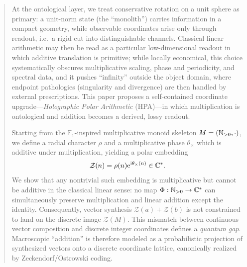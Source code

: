 
\begin{abstract}
At the ontological layer, we treat conservative rotation on a unit sphere as primary: a unit-norm state (the ``monolith'') carries information in a compact geometry, while observable coordinates arise only through readout, i.e.\ a rigid cut into distinguishable channels. Classical linear arithmetic may then be read as a particular low-dimensional readout in which additive translation is primitive; while locally economical, this choice systematically obscures multiplicative scaling, phase and periodicity, and spectral data, and it pushes ``infinity'' outside the object domain, where endpoint pathologies (singularity and divergence) are then handled by external prescriptions. This paper proposes a self-contained coordinate upgrade---\emph{Holographic Polar Arithmetic} (HPA)---in which multiplication is ontological and addition becomes a derived, lossy readout.

Starting from the $\mathbb{F}_1$-inspired multiplicative monoid skeleton $M=(\NN_{>0},\cdot)$, we define a radial character $\rho$ and a multiplicative phase $\theta_\times$ which is additive under multiplication, yielding a polar embedding
$$
\mathcal{Z}(n)=\rho(n)\e^{\iu\theta_\times(n)}\in\CC^*.
$$
We show that any nontrivial such embedding is multiplicative but cannot be additive in the classical linear sense: no map $\Phi:\NN_{>0}\to\CC^*$ can simultaneously preserve multiplication and linear addition except the identity. Consequently, vector synthesis $\mathcal{Z}(a)+\mathcal{Z}(b)$ is not constrained to land on the discrete image $\mathcal{Z}(M)$. This mismatch between continuous vector composition and discrete integer coordinates defines a \emph{quantum gap}. Macroscopic ``addition'' is therefore modeled as a probabilistic projection of synthesized vectors onto a discrete coordinate lattice, canonically realized by Zeckendorf/Ostrowski coding.


\end{abstract}
